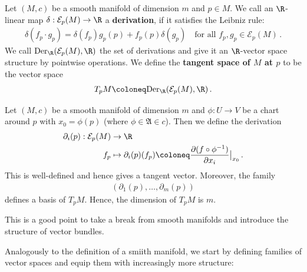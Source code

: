 \begin{definition}
	Let $(M,c)$ be a smooth manifold of dimension $m$ and $p\in M$. We call an $\R$-linear map $\delta:\mathcal{E}_p(M)\to \R$ a \textbf{derivation}, if it satisfies the Leibniz rule:
	\begin{align*}
		\delta(f_p\cdot g_p)=\delta(f_p)g_p(p)+f_p(p)\delta(g_p) \quad \text{for all }f_p,g_p\in \mathcal{E}_p(M) \, .
	\end{align*}
	We call $\mathrm{Der}_{\R}(\mathcal{E}_p(M),\R)$ the set of derivations and give it an $\R$-vector space structure by pointwise operations. We define the \textbf{tangent space of $M$ at $p$} to be the vector space
	\begin{align*}
		T_pM \coloneq \mathrm{Der}_{\R}(\mathcal{E}_p(M),\R) \, .
	\end{align*}
\end{definition}
\begin{corollary}
	Let $(M,c)$ be a smooth manifold of dimension $m$ and $\phi:U\to V$ be a chart around $p$ with $x_0=\phi(p)$ (where $\phi \in \mathfrak{A}\in c$). Then we define the derivation
	\begin{align*}
		\partial_i(p) : \mathcal{E}_p(M) &\to \R \\
		f_p & \mapsto \partial_i(p)(f_p)\coloneq \frac{\partial(f\circ \phi^{-1})}{\partial x_i}\big|_{x_0}\,.
	\end{align*}This is well-defined and hence gives a tangent vector. Moreover, the family
	\begin{align*}
		\left(\partial_1(p),\dots,\partial_m(p)\right)
	\end{align*} defines a basis of $T_pM$. Hence, the dimension of $T_pM$ is $m$.
\end{corollary}

This is a good point to take a break from smooth manifolds and introduce the structure of vector bundles. 







Analogously to the definition of a smiith manifold, we start by defining families of vector spaces and equip them with increasingly more structure:

